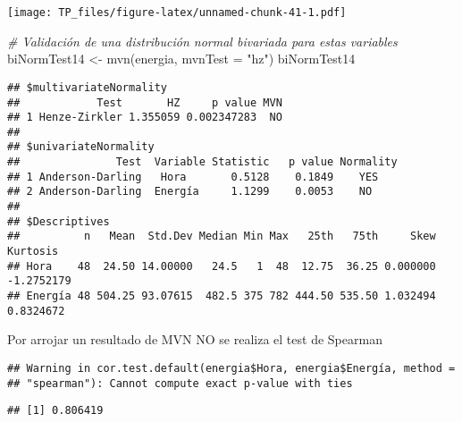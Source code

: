 \documentclass[
]{article}
\newenvironment{Shaded}{\begin{snugshade}}{\end{snugshade}}
\newcommand{\AttributeTok}[1]{\textcolor[rgb]{0.77,0.63,0.00}{#1}}
\newcommand{\CommentTok}[1]{\textcolor[rgb]{0.56,0.35,0.01}{\textit{#1}}}
\newcommand{\ConstantTok}[1]{\textcolor[rgb]{0.00,0.00,0.00}{#1}}
\newcommand{\FunctionTok}[1]{\textcolor[rgb]{0.00,0.00,0.00}{#1}}
\newcommand{\NormalTok}[1]{#1}
\newcommand{\OtherTok}[1]{\textcolor[rgb]{0.56,0.35,0.01}{#1}}
\newcommand{\SpecialCharTok}[1]{\textcolor[rgb]{0.00,0.00,0.00}{#1}}
\newcommand{\StringTok}[1]{\textcolor[rgb]{0.31,0.60,0.02}{#1}}
\begin{document}
\texttt{[image: TP\_files/figure-latex/unnamed-chunk-41-1.pdf]}

\begin{Shaded}
\begin{Highlighting}[]
\CommentTok{\# Validación de una distribución normal bivariada para estas variables}
\NormalTok{biNormTest14 }\OtherTok{\textless{}{-}} \FunctionTok{mvn}\NormalTok{(energia, }\AttributeTok{mvnTest =} \StringTok{"hz"}\NormalTok{)}
\NormalTok{biNormTest14 }
\end{Highlighting}
\end{Shaded}

\begin{verbatim}
## $multivariateNormality
##            Test       HZ     p value MVN
## 1 Henze-Zirkler 1.355059 0.002347283  NO
## 
## $univariateNormality
##               Test  Variable Statistic   p value Normality
## 1 Anderson-Darling   Hora       0.5128    0.1849    YES   
## 2 Anderson-Darling  Energía     1.1299    0.0053    NO    
## 
## $Descriptives
##          n   Mean  Std.Dev Median Min Max   25th   75th     Skew   Kurtosis
## Hora    48  24.50 14.00000   24.5   1  48  12.75  36.25 0.000000 -1.2752179
## Energía 48 504.25 93.07615  482.5 375 782 444.50 535.50 1.032494  0.8324672
\end{verbatim}

Por arrojar un resultado de MVN NO se realiza el test de Spearman

\begin{Shaded}
\end{Shaded}

\begin{verbatim}
## Warning in cor.test.default(energia$Hora, energia$Energía, method =
## "spearman"): Cannot compute exact p-value with ties
\end{verbatim}

\begin{verbatim}
## [1] 0.806419
\end{verbatim}

\begin{Shaded}
\end{Shaded}
\end{document}
